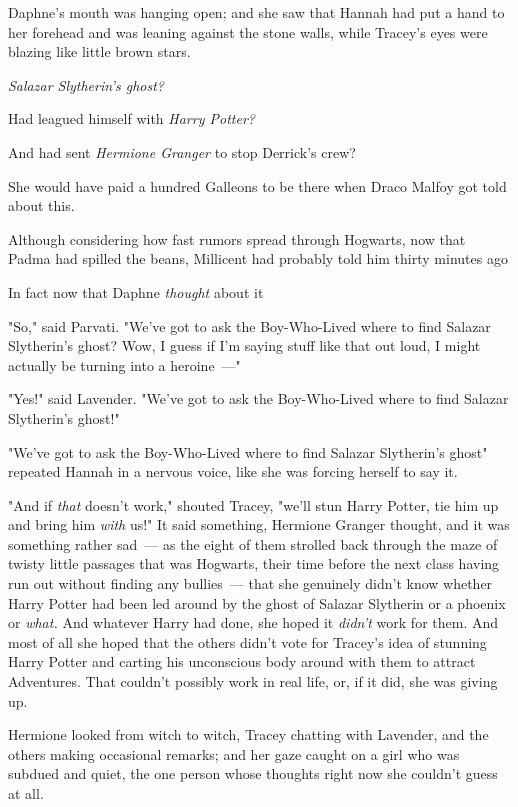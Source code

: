 Daphne's mouth was hanging open; and she saw that Hannah had put a hand to her
forehead and was leaning against the stone walls, while Tracey's eyes were
blazing like little brown stars.

\emph{Salazar Slytherin's ghost?}

Had leagued himself with \emph{Harry Potter?}

And had sent \emph{Hermione Granger} to stop Derrick's crew?

She would have paid a hundred Galleons to be there when Draco Malfoy got told
about this.

Although considering how fast rumors spread through Hogwarts, now that Padma
had spilled the beans, Millicent had probably told him thirty minutes
ago{\el}

In fact{\el} now that Daphne \emph{thought} about it{\el}

"So," said Parvati. "We've got to ask the Boy-Who-Lived where to find Salazar
Slytherin's ghost? Wow, I guess if I'm saying stuff like that out loud, I might
actually be turning into a heroine~---"

"Yes!" said Lavender. "We've got to ask the Boy-Who-Lived where to find Salazar
Slytherin's ghost!"

"We've got to ask{\el} the Boy-Who-Lived{\el} where to find Salazar
Slytherin's ghost{\el}" repeated Hannah in a nervous voice, like she was
forcing herself to say it.

"And if \emph{that} doesn't work," shouted Tracey, "we'll stun Harry Potter,
tie him up and bring him \emph{with} us!"
\sbreak
It said something, Hermione Granger thought, and it was something rather
sad~--- as the eight of them strolled back through the maze of twisty little
passages that was Hogwarts, their time before the next class having run out
without finding any bullies~--- that she genuinely didn't know whether Harry
Potter had been led around by the ghost of Salazar Slytherin or a phoenix or
\emph{what.} And whatever Harry had done, she hoped it \emph{didn't} work for
them. And most of all she hoped that the others didn't vote for Tracey's idea
of stunning Harry Potter and carting his unconscious body around with them to
attract Adventures. That couldn't possibly work in real life, or, if it did,
she was giving up.

Hermione looked from witch to witch, Tracey chatting with Lavender, and the
others making occasional remarks; and her gaze caught on a girl who was subdued
and quiet, the one person whose thoughts right now she couldn't guess at all.


